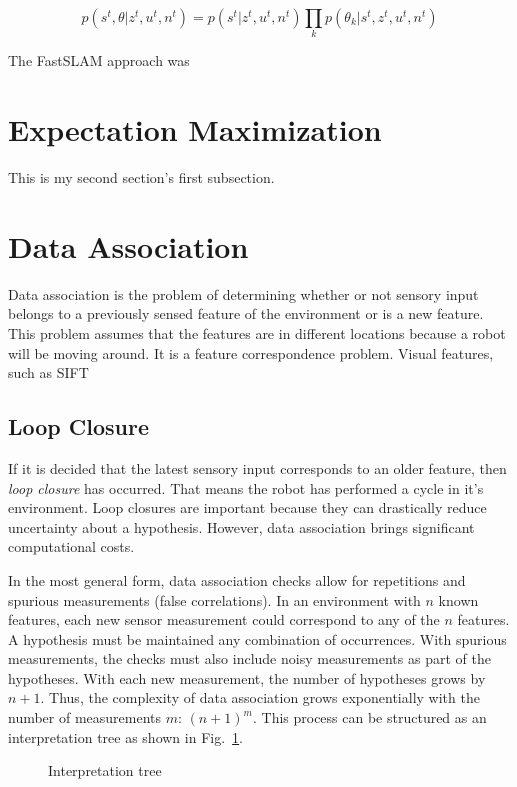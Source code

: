 \documentclass[10pt,conference]{ieeeconf}
\begin{document}
	\begin{equation}
	p(s^t, \theta | z^t, u^t, n^t) = p(s^t | z^t, u^t, n^t) \prod_k p(\theta_k | s^t, z^t, u^t, n^t)
	\end{equation}
	
	The FastSLAM approach was 

\section {Expectation Maximization}
    This is my second section's first subsection.
    
    
\section {Data Association}

	Data association is the problem of determining whether or not sensory input belongs to a previously sensed feature of the environment or is a new feature. This problem assumes that the features are in different locations because a robot will be moving around.
	It is a feature correspondence problem. 
	Visual features, such as SIFT
	
\subsection {Loop Closure}

	If it is decided that the latest sensory input corresponds to an older feature, then \emph{loop closure} has occurred. That means the robot has performed a cycle in it's environment. Loop closures are important because they can drastically reduce uncertainty about a hypothesis. However, data association brings significant computational costs. 
	
	In the most general form, data association checks allow for repetitions and spurious measurements (false correlations). In an environment with $n$ known features, each new sensor measurement could correspond to any of the $n$ features. A hypothesis must be maintained any combination of occurrences. With spurious measurements, the checks must also include noisy measurements as part of the hypotheses. With each new measurement, the number of hypotheses grows by $n+1$. Thus, the complexity of data association grows exponentially with the number of measurements $m$: $(n+1)^m$. This process can be structured as an interpretation tree as shown in Fig.~\ref{tree}.
	
	\begin{figure}
	\caption{Interpretation tree}
	\label{tree}
	\end{figure}
\end{document}
